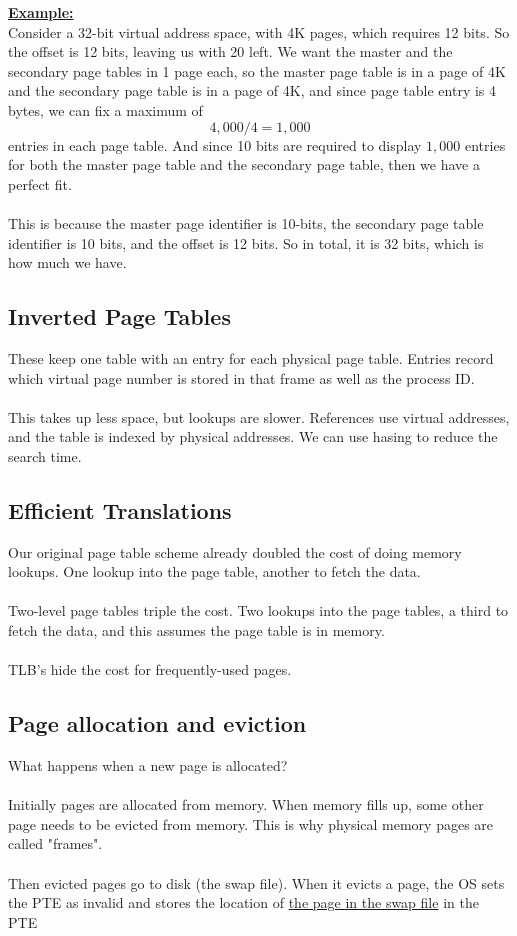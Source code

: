 \documentclass{article}
\begin{document}
\textbf{\underline{Example:}}\\
Consider a 32-bit virtual address space, with 4K pages, which requires 12 bits. So the offset is 12 bits, leaving us with 20 left. We want the master and the secondary page tables in 1 page each, so the master page table is in a page of 4K and the secondary page table is in a page of 4K, and since page table entry is 4 bytes, we can fix a maximum of
$$4,000 / 4 = 1,000$$
entries in each page table. And since 10 bits are required to display $1,000$ entries for both the master page table and the secondary page table, then we have a perfect fit.\\
\\
This is because the master page identifier is 10-bits, the secondary page table identifier is 10 bits, and the offset is 12 bits. So in total, it is 32 bits, which is how much we have.

\subsection{Inverted Page Tables}

These keep one table with an entry for each physical page table. Entries record which virtual page number is stored in that frame as well as the process ID.\\
\\
This takes up less space, but lookups are slower. References use virtual addresses, and the table is indexed by physical addresses. We can use hasing to reduce the search time.

\subsection{Efficient Translations}

Our original page table scheme already doubled the cost of doing memory lookups. One lookup into the page table, another to fetch the data.\\
\\
Two-level page tables triple the cost. Two lookups into the page tables, a third to fetch the data, and this assumes the page table is in memory.\\
\\
TLB's hide the cost for frequently-used pages.

\subsection{Page allocation and eviction}
What happens when a new page is allocated?\\
\\
Initially pages are allocated from memory. When memory fills up, some other page needs to be evicted from memory. This is why physical memory pages are called "frames".\\
\\
Then evicted pages go to disk (the swap file). When it evicts a page, the OS sets the PTE as invalid and stores the location of \underline{the page in the swap file} in the PTE
\end{document}
